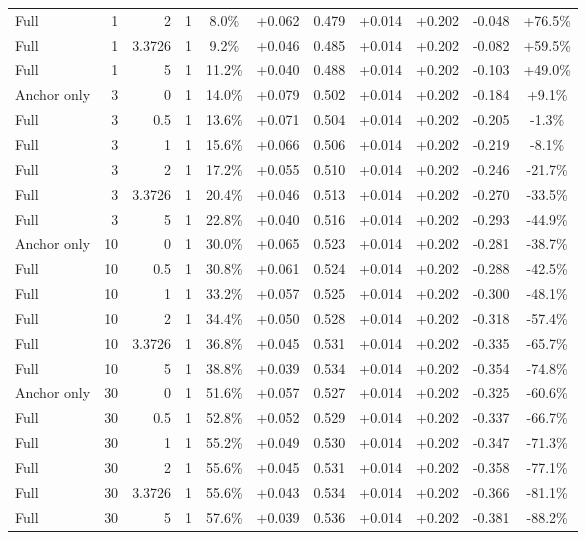 \begin{table}[htbp]
\begin{tabular}{lrrrccccccc}
Full & 1 & 2 & 1 & 8.0\% & +0.062 & 0.479 & +0.014 & +0.202 & -0.048 & +76.5\% \\
Full & 1 & 3.3726 & 1 & 9.2\% & +0.046 & 0.485 & +0.014 & +0.202 & -0.082 & +59.5\% \\
Full & 1 & 5 & 1 & 11.2\% & +0.040 & 0.488 & +0.014 & +0.202 & -0.103 & +49.0\% \\
Anchor only & 3 & 0 & 1 & 14.0\% & +0.079 & 0.502 & +0.014 & +0.202 & -0.184 & +9.1\% \\
Full & 3 & 0.5 & 1 & 13.6\% & +0.071 & 0.504 & +0.014 & +0.202 & -0.205 & -1.3\% \\
Full & 3 & 1 & 1 & 15.6\% & +0.066 & 0.506 & +0.014 & +0.202 & -0.219 & -8.1\% \\
Full & 3 & 2 & 1 & 17.2\% & +0.055 & 0.510 & +0.014 & +0.202 & -0.246 & -21.7\% \\
Full & 3 & 3.3726 & 1 & 20.4\% & +0.046 & 0.513 & +0.014 & +0.202 & -0.270 & -33.5\% \\
Full & 3 & 5 & 1 & 22.8\% & +0.040 & 0.516 & +0.014 & +0.202 & -0.293 & -44.9\% \\
Anchor only & 10 & 0 & 1 & 30.0\% & +0.065 & 0.523 & +0.014 & +0.202 & -0.281 & -38.7\% \\
Full & 10 & 0.5 & 1 & 30.8\% & +0.061 & 0.524 & +0.014 & +0.202 & -0.288 & -42.5\% \\
Full & 10 & 1 & 1 & 33.2\% & +0.057 & 0.525 & +0.014 & +0.202 & -0.300 & -48.1\% \\
Full & 10 & 2 & 1 & 34.4\% & +0.050 & 0.528 & +0.014 & +0.202 & -0.318 & -57.4\% \\
Full & 10 & 3.3726 & 1 & 36.8\% & +0.045 & 0.531 & +0.014 & +0.202 & -0.335 & -65.7\% \\
Full & 10 & 5 & 1 & 38.8\% & +0.039 & 0.534 & +0.014 & +0.202 & -0.354 & -74.8\% \\
Anchor only & 30 & 0 & 1 & 51.6\% & +0.057 & 0.527 & +0.014 & +0.202 & -0.325 & -60.6\% \\
Full & 30 & 0.5 & 1 & 52.8\% & +0.052 & 0.529 & +0.014 & +0.202 & -0.337 & -66.7\% \\
Full & 30 & 1 & 1 & 55.2\% & +0.049 & 0.530 & +0.014 & +0.202 & -0.347 & -71.3\% \\
Full & 30 & 2 & 1 & 55.6\% & +0.045 & 0.531 & +0.014 & +0.202 & -0.358 & -77.1\% \\
Full & 30 & 3.3726 & 1 & 55.6\% & +0.043 & 0.534 & +0.014 & +0.202 & -0.366 & -81.1\% \\
Full & 30 & 5 & 1 & 57.6\% & +0.039 & 0.536 & +0.014 & +0.202 & -0.381 & -88.2\% \\

\end{tabular}
\end{table}
